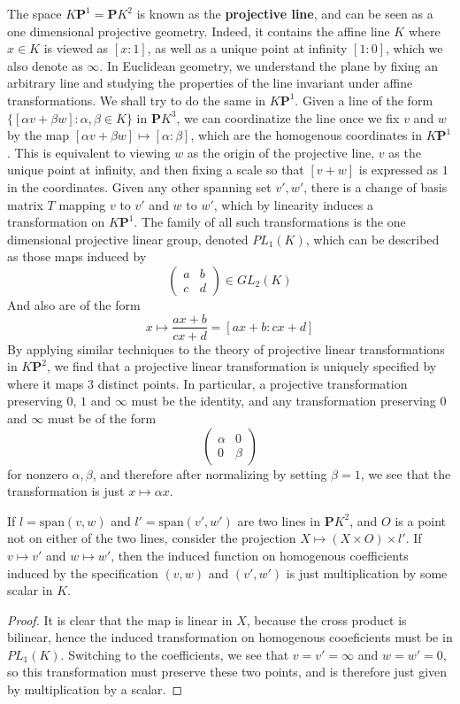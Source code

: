 The space $K\mathbf{P}^1 = \mathbf{P}K^2$ is known as the {\bf projective line}, and can be seen as a one dimensional projective geometry. Indeed, it contains the affine line $K$ where $x \in K$ is viewed as $[x:1]$, as well as a unique point at infinity $[1:0]$, which we also denote as $\infty$. In Euclidean geometry, we understand the plane by fixing an arbitrary line and studying the properties of the line invariant under affine transformations. We shall try to do the same in $K\mathbf{P}^1$. Given a line of the form $\{ [\alpha v + \beta w] : \alpha, \beta \in K \}$ in $\mathbf{P}K^3$, we can coordinatize the line once we fix $v$ and $w$ by the map $[\alpha v + \beta w] \mapsto [\alpha: \beta]$, which are the homogenous coordinates in $K\mathbf{P}^1$. This is equivalent to viewing $w$ as the origin of the projective line, $v$ as the unique point at infinity, and then fixing a scale so that $[v+w]$ is expressed as $1$ in the coordinates. Given any other spanning set $v',w'$, there is a change of basis matrix $T$ mapping $v$ to $v'$ and $w$ to $w'$, which by linearity induces a transformation on $K\mathbf{P}^1$. The family of all such transformations is the one dimensional projective linear group, denoted $PL_1(K)$, which can be described as those maps induced by
%
\[ \begin{pmatrix} a & b \\ c & d \end{pmatrix} \in GL_2(K) \]
%
And also are of the form
%
\[ x \mapsto \frac{ax + b}{cx + d} = [ax + b: cx + d] \]
%
By applying similar techniques to the theory of projective linear transformations in $K\mathbf{P}^2$, we find that a projective linear transformation is uniquely specified by where it maps 3 distinct points. In particular, a projective transformation preserving $0$, $1$ and $\infty$ must be the identity, and any transformation preserving $0$ and $\infty$ must be of the form
%
\[ \begin{pmatrix} \alpha & 0 \\ 0 & \beta \end{pmatrix} \]
%
for nonzero $\alpha, \beta$, and therefore after normalizing by setting $\beta = 1$, we see that the transformation is just $x \mapsto \alpha x$.

\begin{lemma}
    If $l = \text{span}(v,w)$ and $l' = \text{span}(v',w')$ are two lines in $\mathbf{P}K^2$, and $O$ is a point not on either of the two lines, consider the projection $X \mapsto (X \times O) \times l'$. If $v \mapsto v'$ and $w \mapsto w'$, then the induced function on homogenous coefficients induced by the specification $(v,w)$ and $(v',w')$ is just multiplication by some scalar in $K$.
\end{lemma}
\begin{proof}
    It is clear that the map is linear in $X$, because the cross product is bilinear, hence the induced transformation on homogenous cooeficients must be in $PL_1(K)$. Switching to the coefficients, we see that $v = v' = \infty$ and $w = w' = 0$, so this transformation must preserve these two points, and is therefore just given by multiplication by a scalar.
\end{proof}

